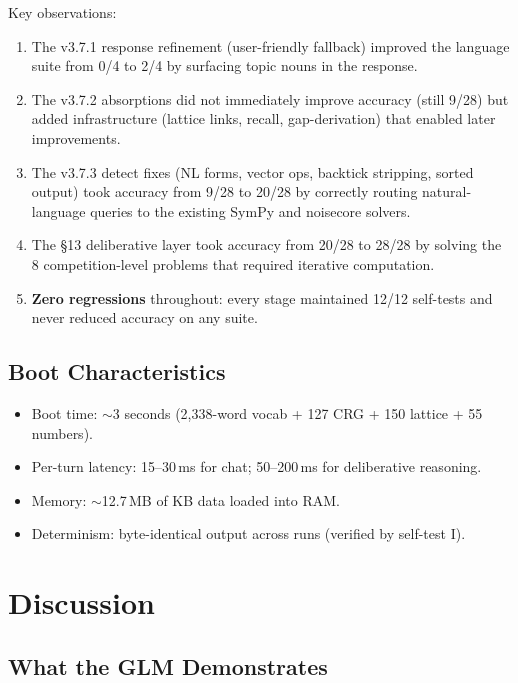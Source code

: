 \documentclass[11pt,a4paper]{article}
\begin{document}
Key observations:

\begin{enumerate}
    \item The v3.7.1 response refinement (user-friendly fallback) improved the language suite from 0/4 to 2/4 by surfacing topic nouns in the response.
    \item The v3.7.2 absorptions did not immediately improve accuracy (still 9/28) but added infrastructure (lattice links, recall, gap-derivation) that enabled later improvements.
    \item The v3.7.3 detect fixes (NL forms, vector ops, backtick stripping, sorted output) took accuracy from 9/28 to 20/28 by correctly routing natural-language queries to the existing SymPy and noisecore solvers.
    \item The \S13 deliberative layer took accuracy from 20/28 to 28/28 by solving the 8 competition-level problems that required iterative computation.
    \item \textbf{Zero regressions} throughout: every stage maintained 12/12 self-tests and never reduced accuracy on any suite.
\end{enumerate}

\subsection{Boot Characteristics}

\begin{itemize}
    \item Boot time: $\sim$3 seconds (2,338-word vocab + 127 CRG + 150 lattice + 55 numbers).
    \item Per-turn latency: 15--30\,ms for chat; 50--200\,ms for deliberative reasoning.
    \item Memory: $\sim$12.7\,MB of KB data loaded into RAM.
    \item Determinism: byte-identical output across runs (verified by self-test I).
\end{itemize}

\section{Discussion}
\label{sec:discussion}

\subsection{What the GLM Demonstrates}
\end{document}
